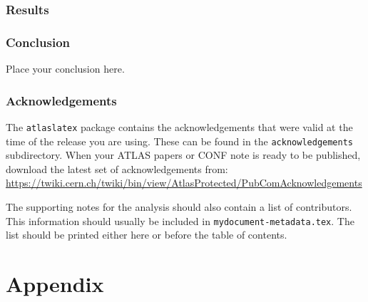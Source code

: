 \documentclass[UKenglish,texlive=2015,subcaption=true]{latex/atlasdoc}
\begin{document}
\clearpage
\section{Results}
\label{sec:results}
%



\section{Conclusion}
\label{sec:conclusion}
%  
Place your conclusion here.


\section*{Acknowledgements}

%

The \texttt{atlaslatex} package contains the acknowledgements that were valid 
at the time of the release you are using. These can be found in the
\texttt{acknowledgements} subdirectory.
When your ATLAS papers or CONF note is ready to be published,
download the latest set of acknowledgements from:\\
\url{https://twiki.cern.ch/twiki/bin/view/AtlasProtected/PubComAcknowledgements}

The supporting notes for the analysis should also contain a list of contributors.
This information should usually be included in \texttt{mydocument-metadata.tex}.
The list should be printed either here or before the table of contents.


\clearpage
\appendix
\part*{Appendix}



\end{document}
